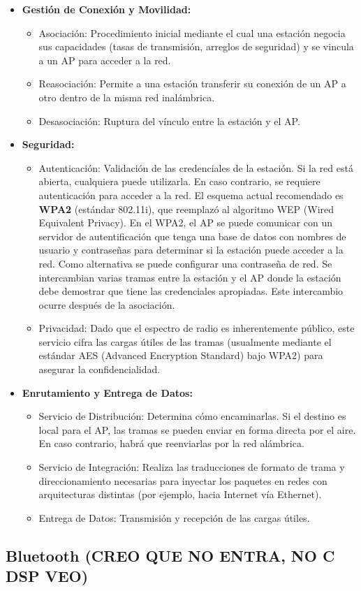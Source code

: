\begin{itemize}
    \item \textbf{Gestión de Conexión y Movilidad:}
    \begin{itemize}
        \item Asociación: Procedimiento inicial mediante el cual una estación negocia sus capacidades (tasas de transmisión, arreglos de seguridad) y se vincula a un AP para acceder a la red.
        \item Reasociación: Permite a una estación transferir su conexión de un AP a otro dentro de la misma red inalámbrica.
        \item Desasociación: Ruptura del vínculo entre la estación y el AP.
    \end{itemize}

    \item \textbf{Seguridad:}
    \begin{itemize}
        \item Autenticación: Validación de las credenciales de la estación. Si la red está abierta, cualquiera puede utilizarla. En caso contrario, se requiere autenticación para acceder a la red. El esquema actual recomendado es \textbf{WPA2} (estándar 802.11i), que reemplazó al algoritmo WEP (Wired Equivalent Privacy). En el WPA2, el AP se puede comunicar con un servidor de autentificación que tenga una base de datos con nombres de usuario y contraseñas para determinar si la estación puede acceder a la red. Como alternativa se puede configurar una contraseña de red. Se intercambian varias tramas entre la estación y el AP donde la estación debe demostrar que tiene las credenciales apropiadas. Este intercambio ocurre después de la asociación.
        \item Privacidad: Dado que el espectro de radio es inherentemente público, este servicio cifra las cargas útiles de las tramas (usualmente mediante el estándar AES (Advanced Encryption Standard) bajo WPA2) para asegurar la confidencialidad.
    \end{itemize}

    \item \textbf{Enrutamiento y Entrega de Datos:}
    \begin{itemize}
        \item Servicio de Distribución: Determina cómo encaminarlas. Si el destino es local para el AP, las tramas se pueden enviar en forma directa por el aire. En caso contrario, habrá que reenviarlas por la red alámbrica.
        \item Servicio de Integración: Realiza las traducciones de formato de trama y direccionamiento necesarias para inyectar los paquetes en redes con arquitecturas distintas (por ejemplo, hacia Internet vía Ethernet).
        \item Entrega de Datos: Transmisión y recepción de las cargas útiles.
    \end{itemize}
\end{itemize}

\subsection{Bluetooth (CREO QUE NO ENTRA, NO C DSP VEO)}
